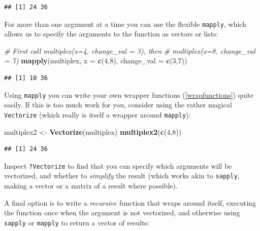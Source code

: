 \documentclass[]{book}
\newenvironment{Shaded}{\begin{snugshade}}{\end{snugshade}}
\newcommand{\CommentTok}[1]{\textcolor[rgb]{0.56,0.35,0.01}{\textit{#1}}}
\newcommand{\DataTypeTok}[1]{\textcolor[rgb]{0.13,0.29,0.53}{#1}}
\newcommand{\DecValTok}[1]{\textcolor[rgb]{0.00,0.00,0.81}{#1}}
\newcommand{\KeywordTok}[1]{\textcolor[rgb]{0.13,0.29,0.53}{\textbf{#1}}}
\newcommand{\NormalTok}[1]{#1}
\newcommand{\StringTok}[1]{\textcolor[rgb]{0.31,0.60,0.02}{#1}}
\begin{document}
\begin{verbatim}
## [1] 24 36
\end{verbatim}

For more than one argument at a time you can use the flexible \texttt{mapply}, which allows us to specify the arguments to the function as vectors or lists:

\begin{Shaded}
\begin{Highlighting}[]
\CommentTok{# First call multiplex(x=4, change_val = 3), then }
\CommentTok{# multiplex(x=8, change_val = 7)}
\KeywordTok{mapply}\NormalTok{(multiplex, }\DataTypeTok{x =} \KeywordTok{c}\NormalTok{(}\DecValTok{4}\NormalTok{,}\DecValTok{8}\NormalTok{), }\DataTypeTok{change_val =} \KeywordTok{c}\NormalTok{(}\DecValTok{3}\NormalTok{,}\DecValTok{7}\NormalTok{))}
\end{Highlighting}
\end{Shaded}

\begin{verbatim}
## [1] 10 36
\end{verbatim}

Using \texttt{mapply} you can write your own wrapper functions (\ref{wrapfunctions}) quite easily. If this is too much work for you, consider using the rather magical \texttt{Vectorize} (which really is itself a wrapper around \texttt{mapply}):

\begin{Shaded}
\begin{Highlighting}[]
\NormalTok{multiplex2 <-}\StringTok{ }\KeywordTok{Vectorize}\NormalTok{(multiplex)}
\KeywordTok{multiplex2}\NormalTok{(}\KeywordTok{c}\NormalTok{(}\DecValTok{4}\NormalTok{,}\DecValTok{8}\NormalTok{))}
\end{Highlighting}
\end{Shaded}

\begin{verbatim}
## [1] 24 36
\end{verbatim}

Inspect \texttt{?Vectorize} to find that you can specify which arguments will be vectorized, and whether to \emph{simplify} the result (which works akin to \texttt{sapply}, making a vector or a matrix of a result where possible).

A final option is to write a \emph{recursive} function that wraps around itself, executing the function once when the argument is not vectorized, and otherwise using \texttt{sapply} or \texttt{mapply} to return a vector of results:
\end{document}
